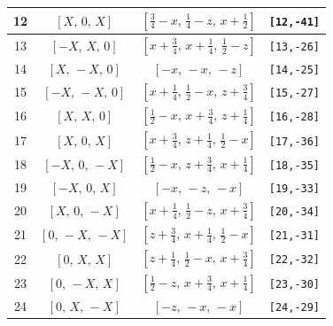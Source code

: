 \documentclass[fleqn,8pt]{jsarticle}
\begin{document}
\begin{longtable}{cccc}
12 & $\left[ X,\, 0,\, X \right]$ & $\left[ \frac{3}{4} - x,\, \frac{1}{4} - z,\, x + \frac{1}{2} \right]$ & {\tt [12,-41]} \\ \hline
13 & $\left[ - X,\, X,\, 0 \right]$ & $\left[ x + \frac{3}{4},\, x + \frac{1}{4},\, \frac{1}{2} - z \right]$ & {\tt [13,-26]} \\ \hline
14 & $\left[ X,\, - X,\, 0 \right]$ & $\left[ - x,\, - x,\, - z \right]$ & {\tt [14,-25]} \\ \hline
15 & $\left[ - X,\, - X,\, 0 \right]$ & $\left[ x + \frac{1}{4},\, \frac{1}{2} - x,\, z + \frac{3}{4} \right]$ & {\tt [15,-27]} \\ \hline
16 & $\left[ X,\, X,\, 0 \right]$ & $\left[ \frac{1}{2} - x,\, x + \frac{3}{4},\, z + \frac{1}{4} \right]$ & {\tt [16,-28]} \\ \hline
17 & $\left[ X,\, 0,\, X \right]$ & $\left[ x + \frac{3}{4},\, z + \frac{1}{4},\, \frac{1}{2} - x \right]$ & {\tt [17,-36]} \\ \hline
18 & $\left[ - X,\, 0,\, - X \right]$ & $\left[ \frac{1}{2} - x,\, z + \frac{3}{4},\, x + \frac{1}{4} \right]$ & {\tt [18,-35]} \\ \hline
19 & $\left[ - X,\, 0,\, X \right]$ & $\left[ - x,\, - z,\, - x \right]$ & {\tt [19,-33]} \\ \hline
20 & $\left[ X,\, 0,\, - X \right]$ & $\left[ x + \frac{1}{4},\, \frac{1}{2} - z,\, x + \frac{3}{4} \right]$ & {\tt [20,-34]} \\ \hline
21 & $\left[ 0,\, - X,\, - X \right]$ & $\left[ z + \frac{3}{4},\, x + \frac{1}{4},\, \frac{1}{2} - x \right]$ & {\tt [21,-31]} \\ \hline
22 & $\left[ 0,\, X,\, X \right]$ & $\left[ z + \frac{1}{4},\, \frac{1}{2} - x,\, x + \frac{3}{4} \right]$ & {\tt [22,-32]} \\ \hline
23 & $\left[ 0,\, - X,\, X \right]$ & $\left[ \frac{1}{2} - z,\, x + \frac{3}{4},\, x + \frac{1}{4} \right]$ & {\tt [23,-30]} \\ \hline
24 & $\left[ 0,\, X,\, - X \right]$ & $\left[ - z,\, - x,\, - x \right]$ & {\tt [24,-29]} \\
\end{longtable}
\renewcommand{\arraystretch}{1.2}
\end{document}
